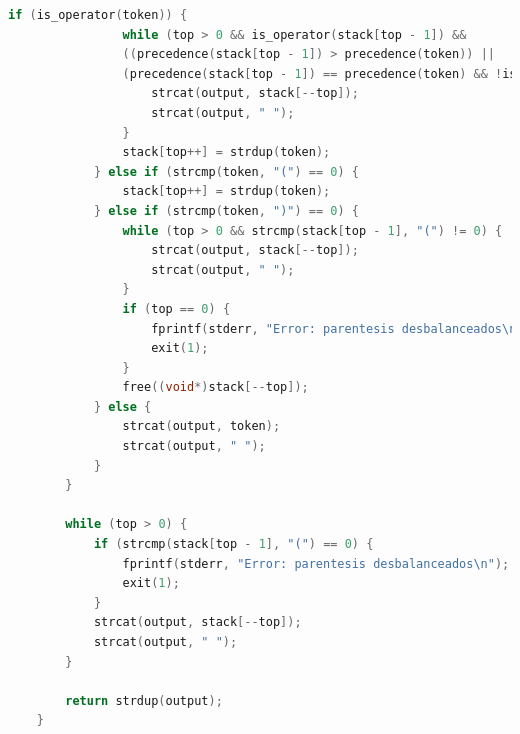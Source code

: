 \documentclass{report}
\begin{document}
\begin{lstlisting}[language=C]
			if (is_operator(token)) {
				while (top > 0 && is_operator(stack[top - 1]) &&
				((precedence(stack[top - 1]) > precedence(token)) ||
				(precedence(stack[top - 1]) == precedence(token) && !is_right_associative(token)))) {
					strcat(output, stack[--top]);
					strcat(output, " ");
				}
				stack[top++] = strdup(token);
			} else if (strcmp(token, "(") == 0) {
				stack[top++] = strdup(token);
			} else if (strcmp(token, ")") == 0) {
				while (top > 0 && strcmp(stack[top - 1], "(") != 0) {
					strcat(output, stack[--top]);
					strcat(output, " ");
				}
				if (top == 0) {
					fprintf(stderr, "Error: parentesis desbalanceados\n");
					exit(1);
				}
				free((void*)stack[--top]);
			} else {
				strcat(output, token);
				strcat(output, " ");
			}
		}
		
		while (top > 0) {
			if (strcmp(stack[top - 1], "(") == 0) {
				fprintf(stderr, "Error: parentesis desbalanceados\n");
				exit(1);
			}
			strcat(output, stack[--top]);
			strcat(output, " ");
		}
		
		return strdup(output);
	}
	\end{lstlisting}
	\newpage
\end{document}
